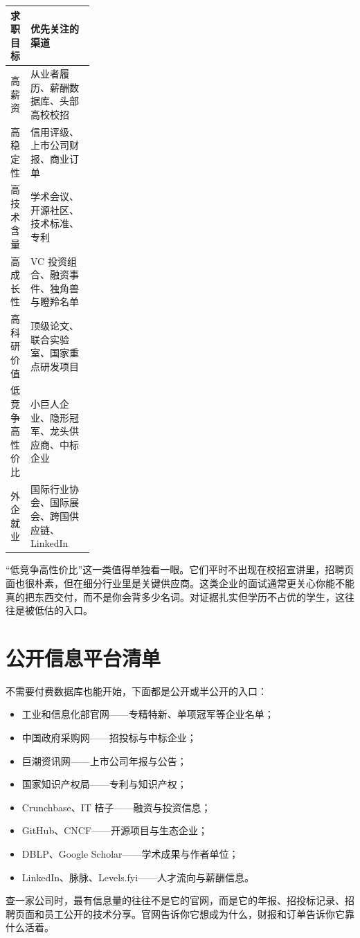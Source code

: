 \documentclass[UTF8,zihao=5,openany]{ctexbook}
\begin{document}
\begin{center}\small
\begin{tabularx}{\linewidth}{p{0.24\linewidth}Y}
\toprule
求职目标 & 优先关注的渠道 \\
\midrule
高薪资 & 从业者履历、薪酬数据库、头部高校校招 \\
高稳定性 & 信用评级、上市公司财报、商业订单 \\
高技术含量 & 学术会议、开源社区、技术标准、专利 \\
高成长性 & VC 投资组合、融资事件、独角兽与瞪羚名单 \\
高科研价值 & 顶级论文、联合实验室、国家重点研发项目 \\
低竞争高性价比 & 小巨人企业、隐形冠军、龙头供应商、中标企业 \\
外企就业 & 国际行业协会、国际展会、跨国供应链、LinkedIn \\
\bottomrule
\end{tabularx}
\end{center}

“低竞争高性价比”这一类值得单独看一眼。它们平时不出现在校招宣讲里，招聘页面也很朴素，但在细分行业里是关键供应商。这类企业的面试通常更关心你能不能真的把东西交付，而不是你会背多少名词。对证据扎实但学历不占优的学生，这往往是被低估的入口。

\section{公开信息平台清单}
不需要付费数据库也能开始，下面都是公开或半公开的入口：
\begin{itemize}
\item 工业和信息化部官网——专精特新、单项冠军等企业名单；
\item 中国政府采购网——招投标与中标企业；
\item 巨潮资讯网——上市公司年报与公告；
\item 国家知识产权局——专利与知识产权；
\item Crunchbase、IT 桔子——融资与投资信息；
\item GitHub、CNCF——开源项目与生态企业；
\item DBLP、Google Scholar——学术成果与作者单位；
\item LinkedIn、脉脉、Levels.fyi——人才流向与薪酬信息。
\end{itemize}

查一家公司时，最有信息量的往往不是它的官网，而是它的年报、招投标记录、招聘页面和员工公开的技术分享。官网告诉你它想成为什么，财报和订单告诉你它靠什么活着。
\end{document}
